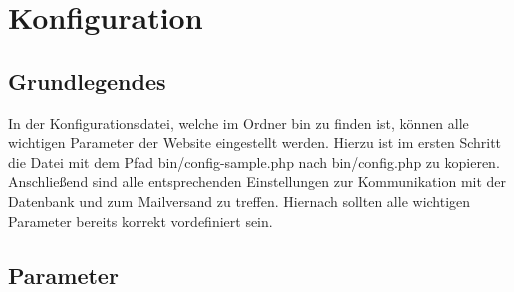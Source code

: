 \chapter{Konfiguration}\label{chapter:config}
\section{Grundlegendes}
In der Konfigurationsdatei, welche im Ordner {\glqq bin\grqq} zu finden ist, können alle wichtigen Parameter der Website eingestellt werden. Hierzu ist im ersten Schritt die Datei mit dem Pfad {\glqq bin/config-sample.php\grqq} nach {\glqq bin/config.php\grqq} zu kopieren. Anschließend sind alle entsprechenden Einstellungen zur Kommunikation mit der Datenbank und zum Mailversand zu treffen. Hiernach sollten alle wichtigen Parameter bereits korrekt vordefiniert sein.
\section{Parameter}
